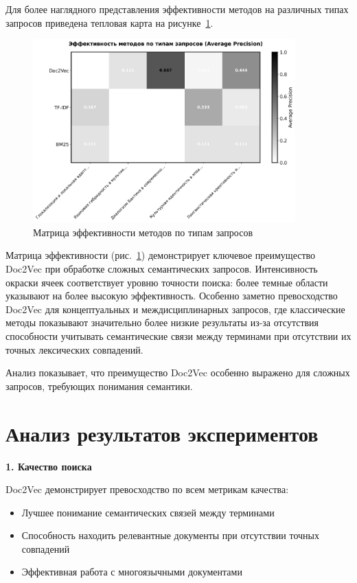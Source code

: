 Для более наглядного представления эффективности методов на различных типах запросов приведена тепловая карта на рисунке~\ref{fig:query_types_matrix}.

\begin{figure}[H]
	\centering
	\includegraphics[width=0.9\textwidth]{images/diploma_bw_plots/query_types_matrix_bw.png}
	\caption{Матрица эффективности методов по типам запросов}
	\label{fig:query_types_matrix}
\end{figure}

Матрица эффективности (рис.~\ref{fig:query_types_matrix}) демонстрирует ключевое преимущество Doc2Vec при обработке сложных семантических запросов. Интенсивность окраски ячеек соответствует уровню точности поиска: более темные области указывают на более высокую эффективность. Особенно заметно превосходство Doc2Vec для концептуальных и междисциплинарных запросов, где классические методы показывают значительно более низкие результаты из-за отсутствия способности учитывать семантические связи между терминами при отсутствии их точных лексических совпадений.

Анализ показывает, что преимущество Doc2Vec особенно выражено для сложных запросов, требующих понимания семантики.

\section{Анализ результатов экспериментов}

\textbf{1. Качество поиска}

Doc2Vec демонстрирует превосходство по всем метрикам качества:
\begin{itemize}
	\item Лучшее понимание семантических связей между терминами
	\item Способность находить релевантные документы при отсутствии точных совпадений
	\item Эффективная работа с многоязычными документами
\end{itemize}


